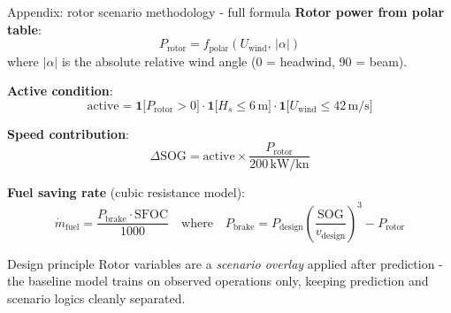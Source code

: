 \documentclass[aspectratio=169]{beamer}
\begin{document}
\begin{frame}[noframenumbering]{Appendix: rotor scenario methodology - full formula}
\small
\textbf{Rotor power from polar table}:
\[
  P_\text{rotor} = f_\text{polar}(U_\text{wind},\, |\alpha|)
\]
where $|\alpha|$ is the absolute relative wind angle (0 = headwind, 90 = beam).

\textbf{Active condition}:
\[
  \text{active} = \mathbf{1}\bigl[P_\text{rotor}>0\bigr]\cdot\mathbf{1}\bigl[H_s \leq 6\,\text{m}\bigr]\cdot\mathbf{1}\bigl[U_\text{wind} \leq 42\,\text{m/s}\bigr]
\]

\textbf{Speed contribution}:
\[
  \Delta\text{SOG} = \text{active} \times \frac{P_\text{rotor}}{200\,\text{kW/kn}}
\]

\textbf{Fuel saving rate} (cubic resistance model):
\[
  \dot{m}_\text{fuel} = \frac{P_\text{brake} \cdot \text{SFOC}}{1000}
  \quad\text{where}\quad
  P_\text{brake} = P_\text{design}\left(\frac{\text{SOG}}{v_\text{design}}\right)^3 - P_\text{rotor}
\]

\begin{block}{Design principle}
Rotor variables are a \emph{scenario overlay} applied after prediction - the baseline model trains on observed operations only, keeping prediction and scenario logics cleanly separated.
\end{block}
\end{frame}
\end{document}
